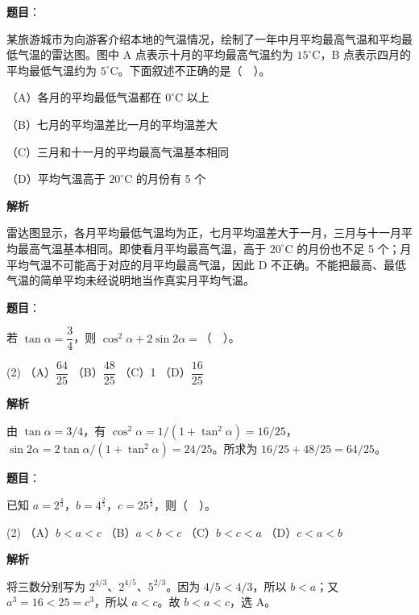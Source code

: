 \begin{answer}

\textbf{题目}：

某旅游城市为向游客介绍本地的气温情况，绘制了一年中月平均最高气温和平均最低气温的雷达图。图中 A 点表示十月的平均最高气温约为 \(15^\circ\mathrm C\)，B 点表示四月的平均最低气温约为 \(5^\circ\mathrm C\)。下面叙述不正确的是（　）。

（A）各月的平均最低气温都在 \(0^\circ\mathrm C\) 以上

（B）七月的平均温差比一月的平均温差大

（C）三月和十一月的平均最高气温基本相同

（D）平均气温高于 \(20^\circ\mathrm C\) 的月份有 5 个
\nopagebreak[4]
\begin{center}\end{center}
\nopagebreak[4]
\textbf{解析}

雷达图显示，各月平均最低气温均为正，七月平均温差大于一月，三月与十一月平均最高气温基本相同。即使看月平均最高气温，高于 \(20^\circ\mathrm C\) 的月份也不足 5 个；月平均气温不可能高于对应的月平均最高气温，因此 D 不正确。不能把最高、最低气温的简单平均未经说明地当作真实月平均气温。


\end{answer}
\begin{answer}

\textbf{题目}：

若 \(\tan\alpha=\dfrac34\)，则 \(\cos^2\alpha+2\sin 2\alpha=\)（　）。

\begin{gkopts}(2)
\task （A）\(\dfrac{64}{25}\)
\task （B）\(\dfrac{48}{25}\)
\task （C）1
\task （D）\(\dfrac{16}{25}\)
\end{gkopts}

\textbf{解析}

由 \(\tan\alpha=3/4\)，有 \(\cos^2\alpha=1/(1+\tan^2\alpha)=16/25\)，\(\sin2\alpha=2\tan\alpha/(1+\tan^2\alpha)=24/25\)。所求为 \(16/25+48/25=64/25\)。


\end{answer}
\begin{answer}

\textbf{题目}：

已知 \(a=2^{\frac43}\)，\(b=4^{\frac25}\)，\(c=25^{\frac13}\)，则（　）。

\begin{gkopts}(2)
\task （A）\(b<a<c\)
\task （B）\(a<b<c\)
\task （C）\(b<c<a\)
\task （D）\(c<a<b\)
\end{gkopts}

\textbf{解析}

将三数分别写为 \(2^{4/3}\)、\(2^{4/5}\)、\(5^{2/3}\)。因为 \(4/5<4/3\)，所以 \(b<a\)；又 \(a^3=16<25=c^3\)，所以 \(a<c\)。故 \(b<a<c\)，选 A。


\end{answer}
